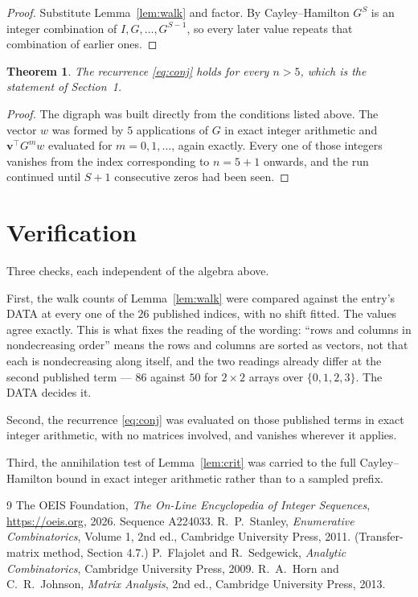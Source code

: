 \documentclass[11pt,a4paper]{article}
\theoremstyle{plain}
\newtheorem{theorem}{Theorem}
\theoremstyle{definition}
\begin{document}
\begin{proof}
Substitute Lemma~\ref{lem:walk} and factor. By Cayley--Hamilton $G^{S}$ is an integer
combination of $I,G,\dots,G^{S-1}$, so every later value repeats that combination of
earlier ones.
\end{proof}

\begin{theorem}
The recurrence \eqref{eq:conj} holds for every $n>5$, which is the statement of
Section~1.
\end{theorem}

\begin{proof}
The digraph was built directly from the conditions listed above. The vector $w$ was formed by
$5$ applications of $G$ in exact integer arithmetic and $\mathbf{v}^{\!\top}G^{m}w$
evaluated for $m=0,1,\dots$, again exactly. Every one of those integers vanishes from the
index corresponding to $n=5+1$ onwards, and the run continued until $S+1$ consecutive
zeros had been seen.
\end{proof}

\section{Verification}

Three checks, each independent of the algebra above.

First, the walk counts of Lemma~\ref{lem:walk} were compared against the entry's DATA at
every one of the $26$ published indices, with no shift fitted. The values agree exactly.
This is what fixes the reading of the wording: ``rows and columns in nondecreasing order''
means the rows and columns are sorted as vectors, not that each is nondecreasing along
itself, and the two readings already differ at the second published term --- $86$ against
$50$ for $2\times2$ arrays over $\{0,1,2,3\}$. The DATA decides it.

Second, the recurrence \eqref{eq:conj} was evaluated on those published terms in exact
integer arithmetic, with no matrices involved, and vanishes wherever it applies.

Third, the annihilation test of Lemma~\ref{lem:crit} was carried to the full
Cayley--Hamilton bound in exact integer arithmetic rather than to a sampled prefix.

\begin{thebibliography}{9}
 The OEIS Foundation, \emph{The On-Line Encyclopedia of Integer
Sequences}, \url{https://oeis.org}, 2026. Sequence A224033.
 R.~P.~Stanley, \emph{Enumerative Combinatorics}, Volume 1, 2nd ed.,
Cambridge University Press, 2011. (Transfer-matrix method, Section 4.7.)
 P.~Flajolet and R.~Sedgewick, \emph{Analytic Combinatorics}, Cambridge
University Press, 2009.
 R.~A.~Horn and C.~R.~Johnson, \emph{Matrix Analysis}, 2nd ed., Cambridge
University Press, 2013.
\end{thebibliography}
\end{document}
